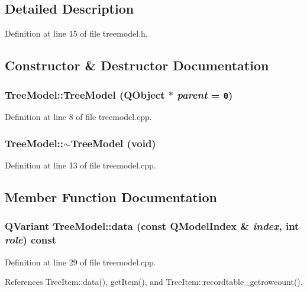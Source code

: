 \subsection{Detailed Description}




Definition at line 15 of file treemodel.h.

\subsection{Constructor \& Destructor Documentation}
\subsubsection{\setlength{\rightskip}{0pt plus 5cm}Tree\-Model::Tree\-Model (QObject $\ast$ {\em parent} = {\tt 0})}\label{classTreeModel_128d1d9d72775d1dfd3be4632c794ce3}




Definition at line 8 of file treemodel.cpp.
\subsubsection{\setlength{\rightskip}{0pt plus 5cm}Tree\-Model::$\sim$Tree\-Model (void)}\label{classTreeModel_b200d2353bb3901d55ee3fab9d70d3ab}




Definition at line 13 of file treemodel.cpp.

\subsection{Member Function Documentation}
\subsubsection{\setlength{\rightskip}{0pt plus 5cm}QVariant Tree\-Model::data (const QModel\-Index \& {\em index}, int {\em role}) const}\label{classTreeModel_986b92267ac9cdc90519c10404192bbd}




Definition at line 29 of file treemodel.cpp.

References Tree\-Item::data(), get\-Item(), and Tree\-Item::recordtable\_\-getrowcount().

